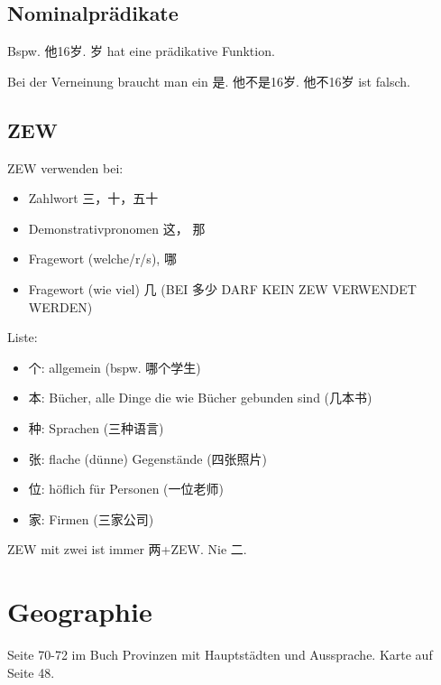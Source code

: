 \documentclass[UTF8]{ctexart}
\begin{document}
\subsection{Nominalprädikate}

Bspw. 他16岁. 岁 hat eine prädikative Funktion.

Bei der Verneinung braucht man ein 是. 他不是16岁. 他不16岁 ist falsch.

\subsection{ZEW}

ZEW verwenden bei:

\begin{itemize}
    \item Zahlwort 三，十，五十
    \item Demonstrativpronomen 这， 那
    \item Fragewort (welche/r/s), 哪
    \item Fragewort (wie viel) 几 (BEI 多少 DARF KEIN ZEW VERWENDET WERDEN)
\end{itemize}

Liste:

\begin{itemize}
    \item 个: allgemein (bspw. 哪个学生)
    \item 本: Bücher, alle Dinge die wie Bücher gebunden sind (几本书)
    \item 种: Sprachen (三种语言)
    \item 张: flache (dünne) Gegenstände (四张照片)
    \item 位: höflich für Personen (一位老师)
    \item 家: Firmen (三家公司)
\end{itemize}

ZEW mit zwei ist immer 两+ZEW. Nie 二.

\section{Geographie}

Seite 70-72 im Buch Provinzen mit Hauptstädten und Aussprache. Karte auf Seite 48.
\end{document}

